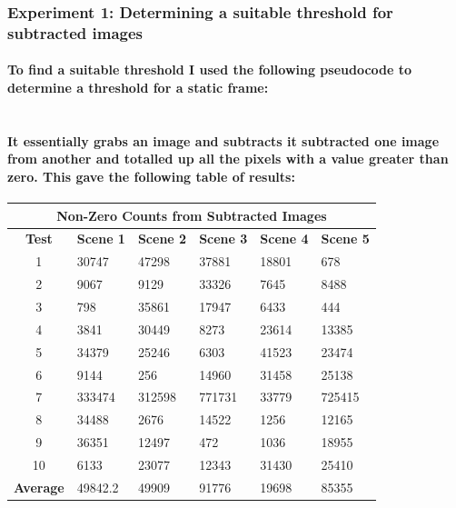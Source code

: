 \documentclass[11pt]{article} %
\begin{document}
\subsubsection{Experiment 1: Determining a suitable threshold for subtracted images}
\paragraph{To find a suitable threshold I used the following pseudocode to determine a threshold for a static frame:\\\\}
\begin{frame}[fragile]
	
\end{frame}
\paragraph{It essentially grabs an image and subtracts it subtracted one image from another and totalled up all the pixels with a value greater than zero. This gave the following table of results:}
\begin{center}
\begin{table}[!htbp]
	\begin{tabular}{| c | l | l | l | l | l | }
\hline
\multicolumn{6}{|c|}{\bf Non-Zero Counts from Subtracted Images} \\
\hline
\bf Test	&\bf Scene 1	&\bf Scene 2	&\bf Scene 3	&\bf Scene 4	&\bf Scene 5	\\ \hline
1	&30747	&47298	&37881	&18801	&678\\
2	&9067	&9129	&33326	&7645	&8488\\
3	&798	&35861	&17947	&6433	&444\\
4	&3841	&30449	&8273	&23614	&13385\\
5	&34379	&25246	&6303	&41523	&23474\\
6	&9144	&256	&14960	&31458	&25138\\
7	&333474	&312598	&771731	&33779	&725415\\
8	&34488	&2676	&14522	&1256	&12165\\
9	&36351	&12497	&472	&1036	&18955\\
10	&6133	&23077	&12343	&31430	&25410\\ \hline
\bf Average	&49842.2	&49909	&91776	&19698	&85355\\ \hline
	\end{tabular}
	\label{tab:sub1}
\end{table}
\end{center}
\end{document}

